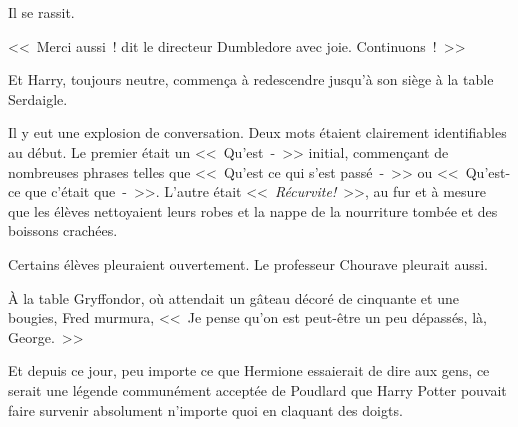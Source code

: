 Il se rassit.

<<~Merci aussi~! dit le directeur Dumbledore avec joie. Continuons~!~>>

Et Harry, toujours neutre, commença à redescendre jusqu'à son siège à la table Serdaigle.

Il y eut une explosion de conversation. Deux mots étaient clairement identifiables au début. Le premier était un <<~Qu'est~-~>> initial, commençant de nombreuses phrases telles que <<~Qu'est ce qui s'est passé~-~>> ou <<~Qu'est-ce que c'était que~-~>>. L'autre était <<~\emph{Récurvite!}~>>, au fur et à mesure que les élèves nettoyaient leurs robes et la nappe de la nourriture tombée et des boissons crachées.

Certains élèves pleuraient ouvertement. Le professeur Chourave pleurait aussi.

À la table Gryffondor, où attendait un gâteau décoré de cinquante et une bougies, Fred murmura, <<~Je pense qu'on est peut-être un peu dépassés, là, George.~>>

Et depuis ce jour, peu importe ce que Hermione essaierait de dire aux gens, ce serait une légende communément acceptée de Poudlard que Harry Potter pouvait faire survenir absolument n'importe quoi en claquant des doigts.~
